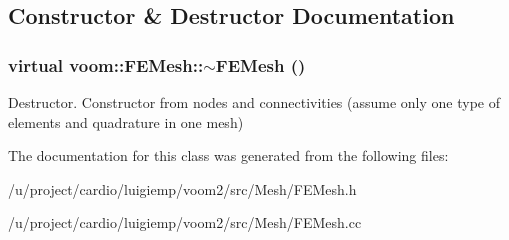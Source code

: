 \subsection{Constructor \& Destructor Documentation}
\hypertarget{classvoom_1_1_f_e_mesh_aca0b20d3ed91ee94eb8cd479de75ca05}{
\subsubsection[{$\sim$FEMesh}]{\setlength{\rightskip}{0pt plus 5cm}virtual voom::FEMesh::$\sim$FEMesh ()}}
\label{classvoom_1_1_f_e_mesh_aca0b20d3ed91ee94eb8cd479de75ca05}


Destructor. Constructor from nodes and connectivities (assume only one type of elements and quadrature in one mesh) 

The documentation for this class was generated from the following files:\begin{DoxyCompactItemize}
\item 
/u/project/cardio/luigiemp/voom2/src/Mesh/FEMesh.h\item 
/u/project/cardio/luigiemp/voom2/src/Mesh/FEMesh.cc\end{DoxyCompactItemize}
